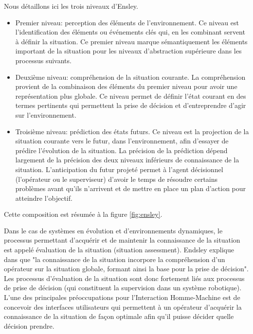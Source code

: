 \documentclass[a4paper,11pt,twoside]{StyleThese}
\begin{document}
Nous détaillons ici les trois niveaux d'Ensley.
\begin{itemize}
\item Premier niveau: perception des éléments de l'environnement. Ce niveau est l'identification des
éléments ou événements clés qui, en les combinant servent à définir la situation.
Ce premier niveau marque sémantiquement les éléments important de la situation pour
les niveaux d'abstraction supérieure dans les processus suivants.
\item Deuxième niveau: compréhension de la situation courante. La compréhension provient de 
la combinaison des éléments du premier niveau pour avoir une représentation plus globale. Ce niveau permet de
définir l'état courant en des termes pertinents qui permettent la prise de 
décision et d'entreprendre d'agir sur l'environnement.
\item Troisième niveau: prédiction des états futurs. Ce niveau est la projection de la situation courante vers le futur, dans l'environnement, afin d'essayer de prédire l'évolution de la situation. La précision de la prédiction dépend largement de la précision des deux niveaux inférieurs de connaissance de la situation. L'anticipation du futur projeté permet à l'agent décisionnel (l'opérateur ou le superviseur) d'avoir le temps de résoudre certains problèmes avant qu'ils n'arrivent et de mettre en place un plan d'action pour atteindre l'objectif.
\end{itemize}
Cette composition est résumée à la figure \ref{fig:ensley}.

Dans le cas de systèmes en évolution et d'environnements dynamiques, le processus permettant d'acquérir et de maintenir la connaissance de la situation est appelé évaluation de la situation (situation assessment). Endsley explique dans \cite{endsley1995} que "la connaissance de la situation incorpore la compréhension d'un opérateur sur la situation globale, formant ainsi la base pour la prise de décision". Les processus d'évaluation de la situation sont donc fortement liés aux processus de prise de décision (qui constituent la supervision dans un système robotique).
L'une des principales préoccupations pour l'Interaction Homme-Machine est de concevoir des interfaces utilisateurs qui permettent à un opérateur d'acquérir la connaissance de la situation de façon optimale afin qu'il puisse décider quelle décision prendre.
\end{document}
